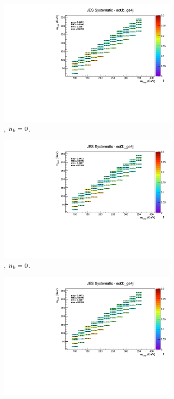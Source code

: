 \begin{figure}[ht!]
\begin{subfigure}[b]{0.32\textwidth}
    \includegraphics[width=\textwidth, page=12]{Figs/sms/t2cc/v37_2/systs/T2cc_JES_eq0b_ge4j.pdf}
    \caption{\njhigh, $n_{\text{b}} = 0$.}
  \end{subfigure}
  \begin{subfigure}[b]{0.32\textwidth}
    \includegraphics[width=\textwidth, page=8]{Figs/sms/t2cc/v37_2/systs/T2cc_JES_eq0b_ge4j.pdf}
    \caption{\njhigh, $n_{\text{b}} = 0$.}
  \end{subfigure}
  \begin{subfigure}[b]{0.32\textwidth}
    \includegraphics[width=\textwidth, page=1]{Figs/sms/t2cc/v37_2/systs/T2cc_JES_eq0b_ge4j.pdf}

\end{subfigure}
\end{figure}
